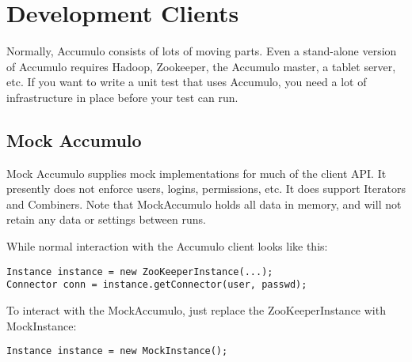 
%
%

\chapter{Development Clients}

Normally, Accumulo consists of lots of moving parts.  Even a stand-alone version of
Accumulo requires Hadoop, Zookeeper, the Accumulo master, a tablet server, etc. If
you want to write a unit test that uses Accumulo, you need a lot of infrastructure
in place before your test can run.

\section{Mock Accumulo}

Mock Accumulo supplies mock implementations for much of the client API. It presently
does not enforce users, logins, permissions, etc. It does support Iterators and Combiners.
Note that MockAccumulo holds all data in memory, and will not retain any data or
settings between runs.

While normal interaction with the Accumulo client looks like this:

\small
\begin{verbatim}
Instance instance = new ZooKeeperInstance(...);
Connector conn = instance.getConnector(user, passwd);
\end{verbatim}
\normalsize

To interact with the MockAccumulo, just replace the ZooKeeperInstance with MockInstance:

\small
\begin{verbatim}
Instance instance = new MockInstance();
\end{verbatim}
\normalsize

